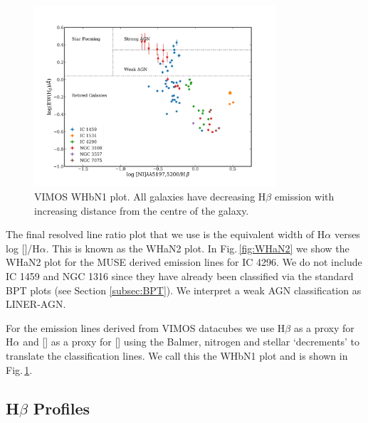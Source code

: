 		\begin{figure}
			\centering
			\includegraphics[width=0.8\textwidth]{chapter5/WHbN1.png}
			\caption[VIMOS WHbN1 plot]{VIMOS WHbN1 plot. All galaxies have decreasing H$\beta$ emission with increasing distance from the centre of the galaxy.}
			\label{fig:WHbN1}
		\end{figure}

		The final resolved line ratio plot that we use is the equivalent width of H$\alpha$ verses log []/H$\alpha$. This is known as the WHaN2 plot. In Fig.\,\ref{fig:WHaN2} we show the WHaN2 plot for the MUSE derived emission lines for IC 4296. We do not include IC 1459 and NGC 1316 since they have already been classified via the standard BPT plots (see Section \ref{subsec:BPT}). We interpret a weak AGN classification as LINER-AGN.

		For the emission lines derived from VIMOS datacubes we use H$\beta$ as a proxy for H$\alpha$ and [] as a proxy for [] using the Balmer, nitrogen and stellar `decrements' to translate the classification lines. We call this the WHbN1 plot and is shown in Fig.\,\ref{fig:WHbN1}.

		



	\subsection{H$\beta$ Profiles}
		\label{subsec:Hb}

